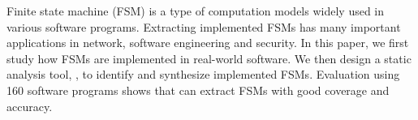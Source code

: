 Finite state machine (FSM) is a type of computation models widely 
used in various software programs. 
Extracting implemented FSMs has many important applications in 
network, software engineering and security. 
In this paper, we first study how FSMs are implemented in real-world software.
We then design a static analysis tool, \Tool{}, to identify and synthesize 
implemented FSMs. 
Evaluation using 160 software programs shows that 
\Tool{} can extract FSMs with good coverage and accuracy. 
